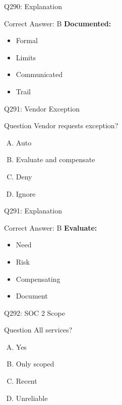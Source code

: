 \documentclass{beamer}
\begin{document}
	\begin{frame}{Q290: Explanation}
		\begin{block}{Correct Answer: B}
			\textbf{Documented:}
			\begin{itemize}
				\item Formal
				\item Limits
				\item Communicated
				\item Trail
			\end{itemize}
		\end{block}
	\end{frame}
	
	\begin{frame}{Q291: Vendor Exception}
		\begin{block}{Question}
			Vendor requests exception?
		\end{block}
		\begin{enumerate}[(A)]
			\item Auto
			\item Evaluate and compensate
			\item Deny
			\item Ignore
		\end{enumerate}
	\end{frame}
	
	\begin{frame}{Q291: Explanation}
		\begin{block}{Correct Answer: B}
			\textbf{Evaluate:}
			\begin{itemize}
				\item Need
				\item Risk
				\item Compensating
				\item Document
			\end{itemize}
		\end{block}
	\end{frame}
	
	\begin{frame}{Q292: SOC 2 Scope}
		\begin{block}{Question}
			All services?
		\end{block}
		\begin{enumerate}[(A)]
			\item Yes
			\item Only scoped
			\item Recent
			\item Unreliable
		\end{enumerate}
	\end{frame}
	
\end{document}
